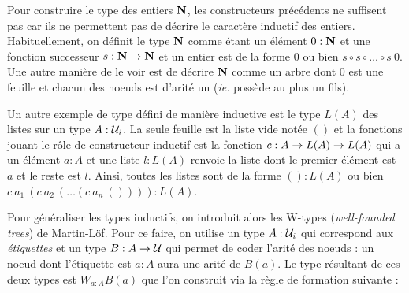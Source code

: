 \documentclass[../../rapport.tex]{subfiles}
\begin{document}
  Pour construire le type des entiers $\mathbf N$, les constructeurs précédents ne suffisent pas car ils ne permettent
  pas de décrire le caractère inductif des entiers.
  Habituellement, on définit le type $\mathbf N$ comme étant un élément $0 : \mathbf N$ et une fonction successeur
  $s : \mathbf N \rightarrow \mathbf N$ et un entier est de la forme $0$ ou bien $s\circ s \circ \hdots \circ s\ 0$.
  Une autre manière de le voir est de décrire $\mathbf N$ comme un arbre dont $0$ est une feuille et
  chacun des noeuds est d'arité un (\textit{ie.} possède au plus un fils).

  \begin{figure}[ht]
    \centering
  \end{figure}

  Un autre exemple de type défini de manière inductive est le type $L(A)$ des listes sur un type $A : \mathcal U_i$.
  La seule feuille est la liste vide notée $()$ et la fonctions jouant le rôle de constructeur inductif est
  la fonction $c : A \rightarrow L(A) \rightarrow L(A)$ qui a un élément $a : A$ et une liste $l : L(A)$ renvoie la liste
  dont le premier élément est $a$ et le reste est $l$.
  Ainsi, toutes les listes sont de la forme $() : L(A)$ ou bien $c\ a_1\ (c\ a_2\ (\hdots (c\ a_n\ ()))) :L(A)$.

  \begin{figure}[ht]
    \centering
  \end{figure}

  Pour généraliser les types inductifs, on introduit alors les W-types (\textit{well-founded trees}) de Martin-Löf.
  Pour ce faire, on utilise un type $A : \mathcal U_i$ qui correspond aux \textit{étiquettes} et un type $B : A \rightarrow \mathcal U$ qui
  permet de coder l'arité des noeuds : un noeud dont l'étiquette est $a : A$ aura une arité de $B(a)$.
  Le type résultant de ces deux types est $W_{a:A} B(a)$ que l'on construit via la règle de formation suivante :
\end{document}
